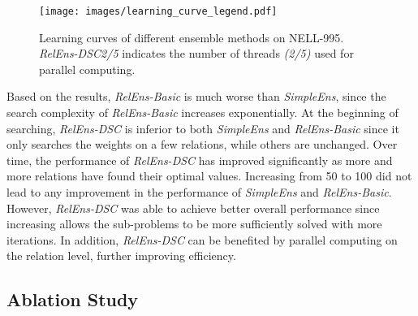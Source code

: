 \documentclass[11pt,a4paper]{article}
\begin{document}
  \begin{figure*}[ht]
    \centering
\texttt{[image: images/learning\_curve\_legend.pdf]}
    \hspace{-8pt}
  	\vspace{-10px}
    \caption{Learning curves of different ensemble methods on NELL-995.
       \textit{RelEns-DSC2/5} indicates the number of threads \textit{(2/5)} used for parallel computing.	
    }
    \label{fig:learning-curve}
    \vspace{-8px}
  \end{figure*}
  
  Based on the results,
  \textit{RelEns-Basic} is much worse than \textit{SimpleEns},
  since the search complexity of \textit{RelEns-Basic} increases exponentially.
  At the beginning of searching,
  \textit{RelEns-DSC} is inferior to both \textit{SimpleEns} and \textit{RelEns-Basic}
  since it only searches the weights on a few relations, while others are unchanged.
  Over time, 
  the performance of \textit{RelEns-DSC} has improved significantly 
  as more and more relations have found their optimal values.
  Increasing  from 50 to 100 did not lead to any improvement in the performance of \textit{SimpleEns} and \textit{RelEns-Basic}. 
  However, \textit{RelEns-DSC} was able to achieve better overall performance 
  since increasing  allows the sub-problems to be more sufficiently solved with more iterations.
  In addition,
  \textit{RelEns-DSC} can be benefited by parallel computing on the relation level,
  further improving efficiency.
  
  
  \subsection{Ablation Study}
  
\end{document}
